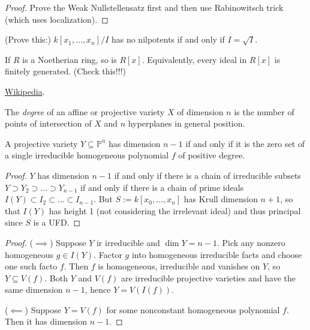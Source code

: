\begin{proof}
Prove the Weak Nullstellensatz first
and then use Rabinowitsch trick 
(which uses localization).
\end{proof}

\noindent
(Prove this:)
$k[x_1,…,x_n]/I$ has no nilpotents if and only if
$I = \sqrt{I}$.

\begin{theorem}
\label{theorem-hilberts-basis}
If $R$ is a Noetherian ring, so is $R[x]$.
Equivalently, every ideal in $R[x]$ is finitely generated.
(Check this!!!)
\end{theorem}

\begin{definition}
\label{definition-degree}
\begin{reference}
\href{https://en.wikipedia.org/wiki/Degree_of_an_algebraic_variety}{Wikipedia}.
\end{reference}
The {\it degree} of an affine or projective
variety $X$ of dimension $n$ is the number of points
of intersection of $X$ and $n$ hyperplanes in general position.
\end{definition}

\begin{exercise}
\label{exercise-hypersurfaces-of-pn}
\begin{reference}
\cite[Exercise I.2.8]{hart}
\end{reference}
A projective variety $Y \subseteq \mathbb{P}^n$ 
has dimension $n-1$ if and only if
it is the zero set of a single irreducible homogeneous polynomial
$f$ of positive degree.
\end{exercise}

\begin{proof}
$Y$ has dimension $n-1$ if and only if there is a chain
of irreducible subsets $Y \supset Y_2\supset… \supset Y_{n-1}$
if and only if there is a chain of
prime ideals $I(Y) \subset I_2 \subset…\subset I_{n-1}$.
But $S:=k[x_0,…,x_n]$ has Krull dimension $n+1$,
so that $I(Y)$ has height 1 
(not considering the irrelevant ideal) and thus principal
since $S$ is a UFD.
\end{proof}

\begin{proof}
($\implies$) Suppose $Y$ ir irreducible
and $\dim Y=n-1$. Pick any nonzero
homogeneous $g \in I(Y)$.
Factor $g$ into homogeneous irreducible
facts and choose one such facto $f$.
Then $f$ is homogeneous, irreducible and vanishes on $Y$,
so $Y \subseteq V(f)$.
Both $Y$ and $V(f)$ are irreducible projective
varieties and have the same dimension $n-1$,
hence $Y=V(I(f))$.

($\impliedby$) Suppose $Y=V(f)$ for some
nonconstant homogeneous polynomial $f$.
Then it has dimension $n-1$.
\end{proof}



